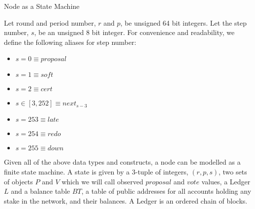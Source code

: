 \documentclass[10pt,a4paper]{article}
\begin{document}
\begin{section}{Node as a State Machine}

Let round and period number, $r$ and $p$, be unsigned 64 bit integers. Let the 
step number, $s$, be an unsigned  8 bit integer.
For convenience and readability, we define the following aliases for step number:
\begin{itemize}
    \item $s=0 \equiv proposal$
    \item $s=1 \equiv soft$
    \item $s=2 \equiv cert$
    \item $s \in [3,252] \equiv next_{s-3}$
    \item $s=253 \equiv late$
    \item $s=254 \equiv redo$
    \item $s=255 \equiv down$
\end{itemize}

Given all of the above data types and constructs, a node can be modelled as 
a finite state machine. A state is given by a 3-tuple of integers, $(r, p, s)$, 
two sets of objects $P$ and $V$ which we will call observed $proposal$ and $vote$ values, 
a Ledger $L$ and a balance table $BT$, a table of public addresses for all 
accounts holding any stake in the network, and their balances. A Ledger is an 
ordered chain of blocks.



\end{section}
\end{document}
